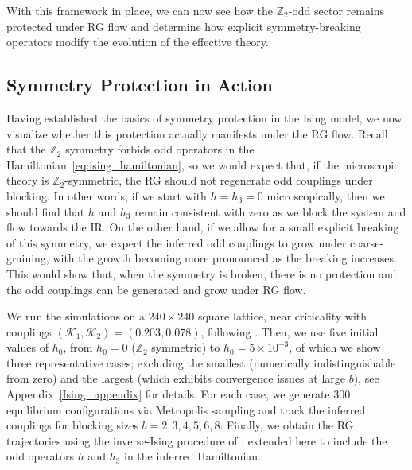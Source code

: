 \documentclass[a4paper, 11pt]{article}
\begin{document}
With this framework in place, we can now see how the $\mathbb{Z}_2$-odd sector remains protected under RG flow and determine how explicit symmetry-breaking operators modify the evolution of the effective theory.

\subsection{Symmetry Protection in Action}

Having established the basics of symmetry protection in the Ising model, we now visualize whether this protection actually manifests under the RG flow. Recall that the $\mathbb{Z}_2$ symmetry forbids odd operators in the Hamiltonian~\eqref{eq:ising_hamiltonian}, so we would expect that, if the microscopic theory is $\mathbb{Z}_2$-symmetric, the RG should not regenerate odd couplings under blocking. In other words, if we start with $h = h_3 = 0$ microscopically, then we should find that $h$ and $h_3$ remain consistent with zero as we block the system and flow towards the IR. On the other hand, if we allow for a small explicit breaking of this symmetry, we expect the inferred odd couplings to grow under coarse-graining, with the growth becoming more pronounced as the breaking increases. This would show that, when the symmetry is broken, there is no protection and the odd couplings can be generated and grow under RG flow.

We run the simulations on a $240\times240$ square lattice, near criticality with couplings $(\mathcal{K}_1,\mathcal{K}_2) = (0.203, 0.078)$, following \cite{blocking}. Then, we use five initial values of $h_0$, from $h_0 = 0$ ($\mathbb{Z}_2$ symmetric) to $h_0 = 5\times10^{-3}$, of which we show three representative cases; excluding the smallest (numerically indistinguishable from zero) and the largest (which exhibits convergence issues at large $b$), see Appendix~\ref{Ising_appendix} for details. For each case, we generate $300$ equilibrium configurations via Metropolis sampling and track the inferred couplings for blocking sizes $b=2,3,4,5,6,8$. Finally, we obtain the RG trajectories using the inverse-Ising procedure of \cite{blocking}, extended here to include the odd operators $h$ and $h_3$ in the inferred Hamiltonian.
\end{document}
